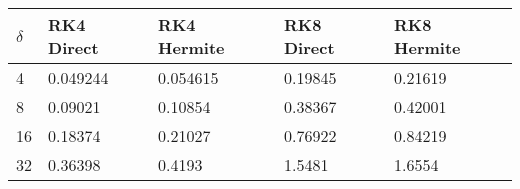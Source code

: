\begin{tabular}{lllll}
\hline
$\delta$ & RK4 Direct & RK4 Hermite & RK8 Direct & RK8 Hermite \\ 
\hline 
4 & 0.049244 & 0.054615 & 0.19845 & 0.21619 \\ 
8 & 0.09021 & 0.10854 & 0.38367 & 0.42001 \\ 
16 & 0.18374 & 0.21027 & 0.76922 & 0.84219 \\ 
32 & 0.36398 & 0.4193 & 1.5481 & 1.6554 \\ 
\hline 
\end{tabular}
